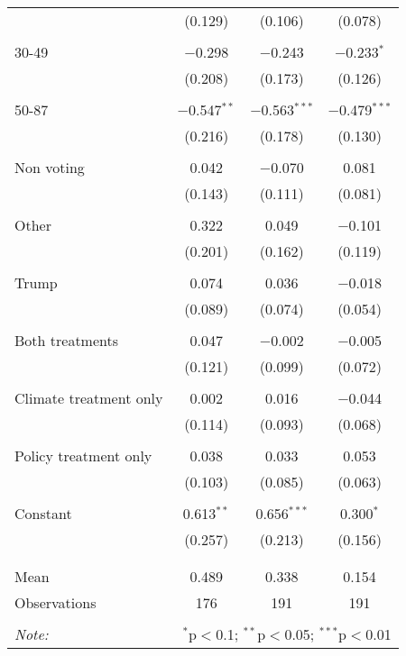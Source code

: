 \begin{tabular}{@{\extracolsep{5pt}}lccc}
  & (0.129) & (0.106) & (0.078) \\ 
  & & & \\ 
 30-49 & $-$0.298 & $-$0.243 & $-$0.233$^{*}$ \\ 
  & (0.208) & (0.173) & (0.126) \\ 
  & & & \\ 
 50-87 & $-$0.547$^{**}$ & $-$0.563$^{***}$ & $-$0.479$^{***}$ \\ 
  & (0.216) & (0.178) & (0.130) \\ 
  & & & \\ 
 Non voting & 0.042 & $-$0.070 & 0.081 \\ 
  & (0.143) & (0.111) & (0.081) \\ 
  & & & \\ 
 Other & 0.322 & 0.049 & $-$0.101 \\ 
  & (0.201) & (0.162) & (0.119) \\ 
  & & & \\ 
 Trump & 0.074 & 0.036 & $-$0.018 \\ 
  & (0.089) & (0.074) & (0.054) \\ 
  & & & \\ 
 Both treatments & 0.047 & $-$0.002 & $-$0.005 \\ 
  & (0.121) & (0.099) & (0.072) \\ 
  & & & \\ 
 Climate treatment only & 0.002 & 0.016 & $-$0.044 \\ 
  & (0.114) & (0.093) & (0.068) \\ 
  & & & \\ 
 Policy treatment only & 0.038 & 0.033 & 0.053 \\ 
  & (0.103) & (0.085) & (0.063) \\ 
  & & & \\ 
 Constant & 0.613$^{**}$ & 0.656$^{***}$ & 0.300$^{*}$ \\ 
  & (0.257) & (0.213) & (0.156) \\ 
  & & & \\ 
\hline \\[-1.8ex] 
Mean & 0.489 & 0.338 & 0.154 \\ 
Observations & 176 & 191 & 191 \\ 
\hline 
\hline \\[-1.8ex] 
\textit{Note:}  & \multicolumn{3}{r}{$^{*}$p$<$0.1; $^{**}$p$<$0.05; $^{***}$p$<$0.01} \\ 
\end{tabular} 
